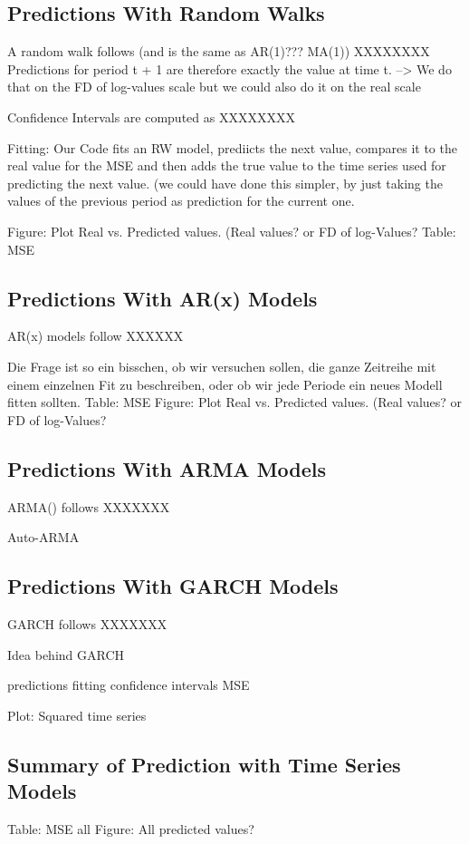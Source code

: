\subsection{Predictions With Random Walks}
A random walk follows (and is the same as AR(1)??? MA(1))
XXXXXXXX
Predictions for period t + 1 are therefore exactly the value at time t. --> We do that on the FD of log-values scale but we could also do it on the real scale

Confidence Intervals are computed as
XXXXXXXX

Fitting: 
Our Code fits an RW model, prediicts the next value, compares it to the real value for the MSE and then adds the true value to the time series used for predicting the next value. (we could have done this simpler, by just taking the values of the previous period as prediction for the current one. 

Figure: Plot Real vs. Predicted values. (Real values? or FD of log-Values?
Table: MSE

\subsection{Predictions With AR(x) Models}
AR(x) models follow
XXXXXX

Die Frage ist so ein bisschen, ob wir versuchen sollen, die ganze Zeitreihe mit einem einzelnen Fit zu beschreiben, oder ob wir jede Periode ein neues Modell fitten sollten. 
Table: MSE
Figure: Plot Real vs. Predicted values. (Real values? or FD of log-Values?

\subsection{Predictions With ARMA Models}
ARMA() follows
XXXXXXX


Auto-ARMA


\subsection{Predictions With GARCH Models}
GARCH follows 
XXXXXXX

Idea behind GARCH

predictions
fitting
confidence intervals
MSE

Plot: Squared time series



\subsection{Summary of Prediction with Time Series Models}
Table: MSE all
Figure: All predicted values?


